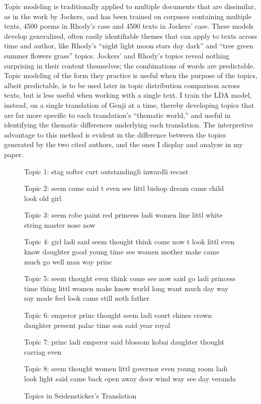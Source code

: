 \documentclass[12pt]{article}
\begin{document}
\begin{flushleft}
\begin{spacing}{2.0}
Topic modeling is traditionally applied to multiple documents that are dissimilar, as in the work by Jockers, and has been trained on corpuses containing multiple texts, 4500 poems in Rhody's case and 4500 texts in Jockers' case. These models develop generalized, often easily identifiable themes that can apply to texts across time and author, like Rhody's ``night light moon stars day dark'' and ``tree green summer flowers grass'' topics. Jockers' and Rhody's topics reveal nothing surprising in their content themselves; the combinations of words are predictable. Topic modeling of the form they practice is useful when the purpose of the topics, albeit predictable, is to be used later in topic distribution comparison across texts, but is less useful when working with a single text. I train the LDA model, instead, on a single translation of Genji at a time, thereby developing topics that are far more specific to each translation's ``thematic world,'' and useful in identifying the thematic differences underlying each translation. The interpretive advantage to this method is evident in the difference between the topics generated by the two cited authors, and the ones I display and analyze in my paper.

\begin{figure}
\caption{Topics in Seidensticker's Translation}
\label{seidensticker-topics}
\singlespacing
\small
Topic 1: stag softer curt outstandingli inwardli recast

Topic 2: seem come said t even see littl bishop dream came child look old girl 

Topic 3: seem robe paint red princess ladi women line littl white string master nose now 

Topic 4: girl ladi said seem thought think come now t look littl even know daughter good young time see women mother make came much go well man way princ 

Topic 5: seem thought even think come see now said go ladi princess time thing littl women make know world long want much day way say made feel look came still noth father 

Topic 6: emperor princ thought seem ladi court chines crown daughter present palac time son said year royal 

Topic 7: princ ladi emperor said blossom kobai daughter thought carriag even 

Topic 8: seem thought women littl governor even young room ladi look light said came back open away door wind way see day veranda 


\end{figure}
\end{spacing}
\end{flushleft}
\end{document}
